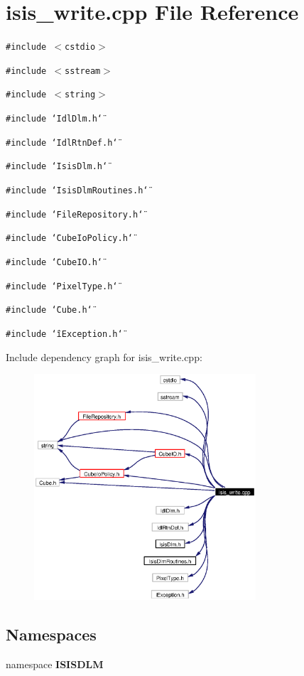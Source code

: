 \section{isis\_\-write.cpp File Reference}
\label{isis__write_8cpp}
{\tt \#include $<$cstdio$>$}\par
{\tt \#include $<$sstream$>$}\par
{\tt \#include $<$string$>$}\par
{\tt \#include \char`\"{}Idl\-Dlm.h\char`\"{}}\par
{\tt \#include \char`\"{}Idl\-Rtn\-Def.h\char`\"{}}\par
{\tt \#include \char`\"{}Isis\-Dlm.h\char`\"{}}\par
{\tt \#include \char`\"{}Isis\-Dlm\-Routines.h\char`\"{}}\par
{\tt \#include \char`\"{}File\-Repository.h\char`\"{}}\par
{\tt \#include \char`\"{}Cube\-Io\-Policy.h\char`\"{}}\par
{\tt \#include \char`\"{}Cube\-IO.h\char`\"{}}\par
{\tt \#include \char`\"{}Pixel\-Type.h\char`\"{}}\par
{\tt \#include \char`\"{}Cube.h\char`\"{}}\par
{\tt \#include \char`\"{}i\-Exception.h\char`\"{}}\par


Include dependency graph for isis\_\-write.cpp:\begin{figure}[H]
\begin{center}
\leavevmode
\includegraphics[width=234pt]{isis__write_8cpp__incl}
\end{center}
\end{figure}
\subsection*{Namespaces}
\begin{CompactItemize}
\item 
namespace {\bf ISISDLM}
\end{CompactItemize}
